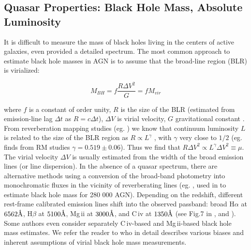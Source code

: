 \documentclass[twocolumn]{aastex62}
\let\oldAA\AA
\renewcommand{\AA}{\text{\normalfont\oldAA}}
\begin{document}
\subsection{Quasar Properties: Black Hole Mass, Absolute Luminosity}

It is difficult to measure the mass of black holes living in the centers of active galaxies, even provided a detailed spectrum.  The most common  approach to estimate black hole masses in AGN is to assume that the broad-line region (BLR) is virialized:


\begin{equation}
M_{BH} = f \frac{ R\Delta V^{2} }{G} = f M_{vir}
\end{equation}


where $f$ is a constant of order unity, $R$ is the size of the BLR (estimated from  emission-line lag $\Delta t$ as $R = c \Delta t$), $\Delta V$ is virial velocity, $G$ gravitational constant \citep{shen2008}.  From reverberation mapping studies (eg. \citealt{shen2018}) we know that continuum luminosity $L$ is related to the size of the BLR region as $R \propto L^{\gamma}$ \citep{vestergaard2006}, with $\gamma$ very close to $1/2$ (eg. \citealt{bentz2009} finds from RM studies $\gamma = 0.519 \pm 0.06$). Thus we find  that $R \Delta V^{2} \propto L^{\gamma} \Delta V^{2} \equiv \mu$. The virial velocity $\Delta V$ is usually estimated from the width of the broad emission lines (or line dispersion).  In the absence of a quasar spectrum, there are alternative methods using a conversion of the broad-band photometry into monochromatic fluxes in the vicinity of reverberating lines (eg. \citealt{kozlowski2015}, used in \citealt{kozlowski2017b} to estimate black hole mass for 280 000 AGN).   
Depending on the redshift, different rest-frame calibrated emission lines shift into the observed passband: broad H$\alpha$ at  $6562\mbox{\AA}$, H$\beta$ at  $5100 \mbox{\AA}$, Mg\,{\sc ii} at $3000\mbox{\AA}$, and C\,{\sc iv} at $1350\mbox{\AA}$ (see Fig.7 in \citealt{shen2018}, and \citealt{vestergaard2002}). Some authors even consider separately C\,{\sc iv}-based and  Mg\,{\sc ii}-based  black hole mass estimates. We refer the reader to \citet{shen2008} who in detail describes various biases and inherent assumptions of virial black hole mass measurements. 
\end{document}
